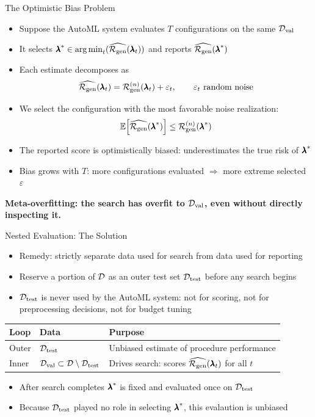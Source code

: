 \documentclass[main]{subfiles}
\begin{document}
\begin{frame}{The Optimistic Bias Problem}
    \begin{itemize}
        \item Suppose the AutoML system evaluates $T$ configurations on the same $\mathcal{D}_{\text{val}}$
        \item It selects ${\pmb{\lambda}}^* \in \operatorname*{arg\,min}_t(\widehat{\mathcal{R}_{\text{gen}}}(\pmb{\lambda}_t))$ and reports $\widehat{\mathcal{R}_{\text{gen}}}({\pmb{\lambda}}^*)$
        \item Each estimate decomposes as
        $$\widehat{\mathcal{R}_{\text{gen}}}(\pmb{\lambda}_t) = \mathcal{R}_{\text{gen}}^{(n)}(\pmb{\lambda}_t) + \varepsilon_t, \qquad \varepsilon_t \text{ random noise}$$
        \item We select the configuration with the most favorable noise realization:
        $$\mathbb{E}\!\left[\widehat{\mathcal{R}_{\text{gen}}}({\pmb{\lambda}}^*)\right] \leq \mathcal{R}_{\text{gen}}^{(n)}({\pmb{\lambda}}^*)$$
        \item The reported score is \alert{optimistically biased}: underestimates the true risk of ${\pmb{\lambda}}^*$
        \item Bias grows with $T$: more configurations evaluated $\Rightarrow$ more extreme selected $\varepsilon$
    \end{itemize}
    \textbf{Meta-overfitting: the search has overfit to $\mathcal{D}_{\text{val}}$, even without directly inspecting it.}
\end{frame}

\begin{frame}{Nested Evaluation: The Solution}
\begin{itemize}
    \item \alert{Remedy}: strictly separate data used for \alert{search} from data used for \alert{reporting}
    \item Reserve a portion of $\mathcal{D}$ as an outer test set $\mathcal{D}_{\text{test}}$ before any search begins
    \item $\mathcal{D}_{\text{test}}$ is never used by the AutoML system: not for scoring, not for preprocessing decisions, not for budget tuning
\end{itemize}
\begin{center}
\begin{tabular}{lll}
    \toprule
     Loop & Data & Purpose  \\
     \midrule
     Outer & $\mathcal{D}_{\text{test}}$ & Unbiased estimate of procedure performance \\
     Inner & $\mathcal{D}_{\text{val}} \subset \mathcal{D} \setminus \mathcal{D}_{\text{test}}$ & Drives search: scores $\widehat{\mathcal{R}_{\text{gen}}}(\pmb{\lambda}_t)$ for all $t$ \\
     \bottomrule
\end{tabular}
\end{center}
\begin{itemize}
    \item After search completes ${\pmb{\lambda}}^*$ is fixed and evaluated once on $\mathcal{D}_{\text{test}}$
    \item Because $\mathcal{D}_{\text{test}}$ played no role in selecting ${\pmb{\lambda}}^*$, this evalaution is unbiased
\end{itemize}
\end{frame}
\end{document}
